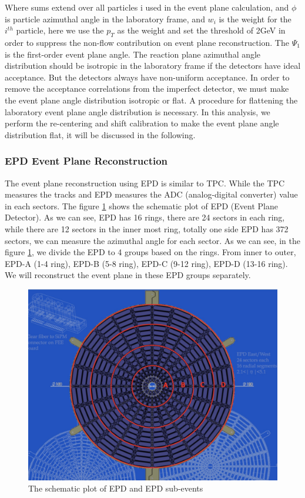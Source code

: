 Where sums extend over all particles i used in the event plane calculation, and $\phi$ is particle azimuthal angle in the laboratory frame, and $w_{i}$ is the weight for the $i^{th}$ particle, here we use the $p_{T}$ as the weight and set the threshold of 2GeV in order to suppress the non-flow contribution on event plane reconstruction. The $\Psi_{1}$ is the first-order event plane angle. The reaction plane azimuthal angle distribution should be isotropic in the laboratory frame if the detectors have ideal acceptance. But the detectors always have non-uniform acceptance. In order to remove the acceptance correlations from the imperfect detector, we must make the event plane angle distribution isotropic or flat. A procedure for flattening the laboratory event plane angle distribution is necessary. In this analysis, we perform the re-centering and shift calibration to make the event plane angle distribution flat, it will be discussed in the following. 
\subsubsection{EPD Event Plane Reconstruction}
The event plane reconstruction using EPD is similar to TPC. While the TPC measures the tracks and EPD measures the ADC (analog-digital converter) value in each sectors. The figure \ref{fig:epd_view} shows the schematic plot of EPD (Event Plane Detector). As we can see, EPD has 16 rings, there are 24 sectors in each ring, while there are 12 sectors in the inner most ring, totally one side EPD has 372 sectors, we can measure the azimuthal angle for each sector.
As we can see, in the figure \ref{fig:epd_view}, we divide the EPD to 4 groups based on the rings. From inner to outer, EPD-A (1-4 ring), EPD-B (5-8 ring), EPD-C (9-12 ring), EPD-D (13-16 ring). We will reconstruct the event plane in these EPD groups separately. 
\begin{figure}[hp]
\includegraphics[scale=0.26]{chapter2/fig/epd_div.png}
\caption{The schematic plot of EPD and EPD sub-events}
\label{fig:epd_view} 
\end{figure}

